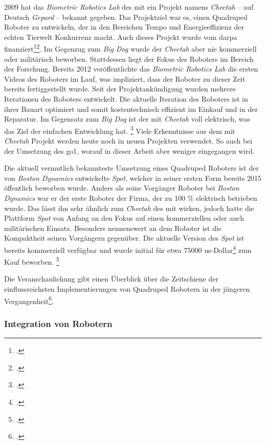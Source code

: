 \num{2009} hat das \emph{Biometric Robotics Lab} des \gls{mit} ein Projekt namens \emph{Cheetah} -- auf Deutsch \emph{Gepard} --
bekannt gegeben.
Das Projektziel war es, einen Quadruped Roboter zu entwickeln, der in den Bereichen Tempo und Energieeffizienz der echten
Tierwelt Konkurrenz macht.
Auch dieses Projekt wurde vom \gls{darpa} finanziert\footcite{bi_mit_cheetah_funding}\footcite{darpa_m3}.
Im Gegenzug zum \emph{Big Dog} wurde der \emph{Cheetah} aber nie kommerziell oder militärisch beworben.
Stattdessen liegt der Fokus des Roboters im Bereich der Forschung.
Bereits \num{2012} veröffentlichte das \emph{Biometric Robotics Lab} die ersten Videos des Roboters im Lauf, was impliziert,
dass der Roboter zu dieser Zeit bereits fertiggestellt wurde.
Seit der Projektankündigung wurden mehrere Iterationen des Roboters entwickelt.
Die aktuelle Iteration des Roboters ist in ihrer Bauart optimiert und somit kostentechnisch effizient im Einkauf und in der Reparatur.
Im Gegensatz zum \emph{Big Dog} ist der \gls{mit} \emph{Cheetah} voll elektrisch, was das Ziel der einfachen Entwicklung hat.
\footcite{ieee_spectrum_cheetah}
Viele Erkenntnisse aus dem \gls{mit} \emph{Cheetah} Projekt werden heute noch in neuen Projekten verwendet.
So auch bei der Umsetzung des \gls{go1}, worauf in dieser Arbeit aber weniger eingegangen wird.

Die aktuell vermutlich bekannteste Umsetzung eines Quadruped Roboters ist der von \emph{Boston Dynamics} entwickelte
\emph{Spot}, welcher in seiner ersten Form bereits \num{2015} öffentlich beworben wurde.
Anders als seine Vorgänger Roboter bei \emph{Boston Dynamics} war er der erste Roboter der Firma, der zu \num{100} \%
elektrisch betrieben wurde.
Das lässt ihn sehr ähnlich zum \emph{Cheetah} des \gls{mit} wirken, jedoch hatte die Plattform \emph{Spot} von Anfang an den
Fokus auf einen kommerziellen oder auch militärischen Einsatz.
Besonders nennenswert an dem Roboter ist die Kompaktheit seinen Vorgängern gegenüber.
Die aktuelle Version des \emph{Spot} ist bereits kommerziell verfügbar und wurde initial für etwa \num{75000} \gls{us}-Dollar\footcite{spot_price}
zum Kauf beworben.
\footcite{boston_dynamics_legacy}

Die Veranschaulichung  gibt einen Überblick über die Zeitschiene der einflussreichsten
Implementierungen von Quadruped Robotern in der jüngeren Vergangenheit\footcite{quadruped_timeline}.


\subsubsection{Integration von Robotern}
\label{subsubsec:integration}


